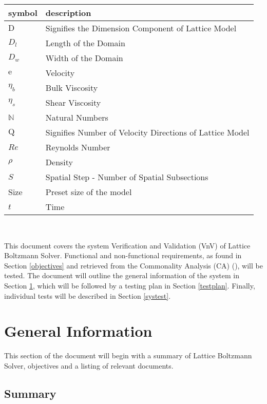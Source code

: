 \documentclass[12pt, titlepage]{article}
\newcommand{\famname}{Lattice Boltzmann Solver}
\begin{document}
\renewcommand{\arraystretch}{1.2}
\begin{tabular}{l l} 
  \toprule		
  \textbf{symbol} & \textbf{description}\\
  \midrule 
  $\mathrm{D}$ & Signifies the Dimension Component of Lattice Model\\
  $D_{l}$ & Length of the Domain\\
  $D_{w}$ & Width of the Domain\\
  $\mathrm{e}$ & Velocity\\
  $\eta_b$ & Bulk Viscosity \\
  $\eta_s$ & Shear Viscosity \\
  $\mathbb{N}$ & Natural Numbers\\
  $\mathrm{Q}$ & Signifies Number of Velocity Directions of Lattice Model\\
  $Re$ & Reynolds Number\\
  $\rho$ & Density \\
  $S$ & Spatial Step - Number of Spatial Subsections\\
  Size & Preset size of the model\\
  $t$ & Time \\
  \bottomrule
\end{tabular}\\

\newpage


\noindent This document covers the system Verification and Validation (VnV) of
\famname . Functional and non-functional requirements, as found in Section
\ref{objectives} and retrieved from the Commonality Analysis (CA)
(\citet{LBM_CA_PM}), will be tested. The document will outline the general
information of the system in Section \ref{generalinfo}, which will be followed
by a testing plan in Section \ref{testplan}. Finally, individual tests will be
described in Section \ref{systest}.

\section{General Information} \label{generalinfo}
This section of the document will begin with a summary of {\famname}, objectives and a listing of relevant documents.

\subsection{Summary}
\end{document}
